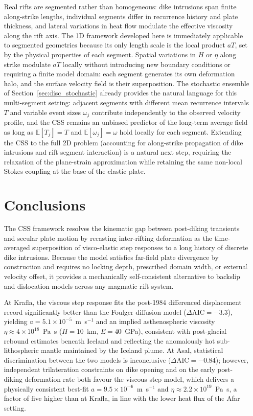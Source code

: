 \documentclass[12pt]{article}
\begin{document}
Real rifts are segmented rather than homogeneous: dike intrusions span finite
along-strike lengths, individual segments differ in recurrence history and
plate thickness, and lateral variations in heat flow modulate the effective
viscosity along the rift axis.  The 1D framework developed here is
immediately applicable to segmented geometries because its only length scale
is the local product $aT$, set by the physical properties of each segment.
Spatial variations in $H$ or $\eta$ along strike modulate $aT$ locally
without introducing new boundary conditions or requiring a finite model
domain: each segment generates its own deformation halo, and the surface
velocity field is their superposition.  The stochastic ensemble of
Section~\ref{sec:disc_stochastic} already provides the natural language for
this multi-segment setting: adjacent segments with different mean recurrence
intervals $T$ and variable event sizes $\omega_j$ contribute independently to
the observed velocity profile, and the CSS remains an unbiased predictor of
the long-term average field as long as $\mathbb{E}[T_j] = T$ and
$\mathbb{E}[\omega_j] = \omega$ hold locally for each segment.  Extending
the CSS to the full 2D problem (accounting for along-strike propagation
of dike intrusions and rift segment interaction) is a natural next step,
requiring the relaxation of the plane-strain approximation while retaining
the same non-local Stokes coupling at the base of the elastic plate.

\section{Conclusions}
\label{sec:conclusions}

The CSS framework resolves the kinematic gap between post-diking transients
and secular plate motion by recasting inter-rifting deformation as the
time-averaged superposition of visco-elastic step responses to a long history
of discrete dike intrusions.  Because the model satisfies far-field plate
divergence by construction and requires no locking depth, prescribed domain
width, or external velocity offset, it provides a mechanically self-consistent
alternative to backslip and dislocation models across any magmatic rift system.

At Krafla, the viscous step response fits the post-1984 differenced
displacement record significantly better than the Foulger diffusion model
($\Delta\mathrm{AIC} = -3.3$), yielding $a = 5.1\times10^{-5}$~m~s$^{-1}$
and an implied asthenospheric viscosity
$\eta \approx 4\times10^{18}$~Pa~s ($H = 10$~km, $E = 40$~GPa), consistent
with post-glacial rebound estimates beneath Iceland and reflecting the
anomalously hot sub-lithospheric mantle maintained by the Iceland plume.  At
Asal, statistical discrimination between the two models is inconclusive
($\Delta\mathrm{AIC} = -0.84$); however, independent trilateration constraints
on dike opening and on the early post-diking deformation rate both favour
the viscous step model, which delivers a physically consistent best-fit
$a = 9.5\times10^{-6}$~m~s$^{-1}$ and $\eta \approx 2.2\times10^{19}$~Pa~s,
a factor of five higher than at Krafla, in line with the lower heat flux
of the Afar setting.
\end{document}
